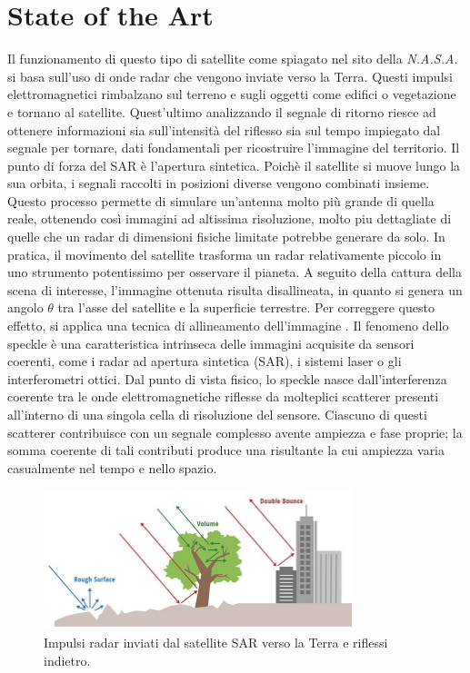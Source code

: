 \chapter{State of the Art}
Il funzionamento 
di questo tipo di satellite come spiagato nel sito della \textit{N.A.S.A.} \cite{nasa_sar} si basa sull'uso di  onde radar che vengono inviate verso la Terra. 
Questi impulsi elettromagnetici rimbalzano sul terreno e sugli 
oggetti come edifici o vegetazione e tornano al satellite. 
Quest'ultimo analizzando il segnale di 
ritorno riesce ad ottenere informazioni sia sull'intensità del riflesso sia sul tempo impiegato 
dal segnale per tornare, dati fondamentali per ricostruire l'immagine del territorio. Il punto 
di forza del SAR è l'apertura sintetica. Poichè il satellite si muove lungo la sua orbita, i 
segnali raccolti in posizioni diverse vengono combinati insieme. Questo processo permette di 
simulare un'antenna molto più grande di quella reale, ottenendo così immagini ad altissima 
risoluzione, molto piu dettagliate di quelle che un radar di dimensioni fisiche limitate potrebbe 
generare da solo. In pratica, il movimento del satellite trasforma un radar relativamente piccolo 
in uno strumento potentissimo per osservare il pianeta. 
A seguito della cattura della scena di interesse, l’immagine ottenuta risulta disallineata, 
in quanto si genera un angolo $\theta$ tra l’asse del satellite e la superficie terrestre. 
Per correggere questo effetto, si applica una tecnica di allineamento dell’immagine \cite{HUGHES2020166}.
Il fenomeno dello speckle è una caratteristica intrinseca delle immagini acquisite da sensori coerenti, 
come i radar ad apertura sintetica (SAR), i sistemi laser o gli interferometri ottici. 
Dal punto di vista fisico, lo speckle nasce dall’interferenza coerente tra le onde elettromagnetiche riflesse 
da molteplici scatterer presenti all’interno di una singola cella di risoluzione del sensore. 
Ciascuno di questi scatterer contribuisce con un segnale complesso avente ampiezza e fase proprie; 
la somma coerente di tali contributi produce una risultante la cui ampiezza varia casualmente nel tempo e nello spazio.
\begin{figure}[H]
  \centering
  \includegraphics[width=0.8\textwidth]{utils/SARPolarization.jpg}
  \caption{Impulsi radar inviati dal satellite SAR verso la Terra e riflessi indietro.}
  \label{fig:sar_scatter}
\end{figure}  
